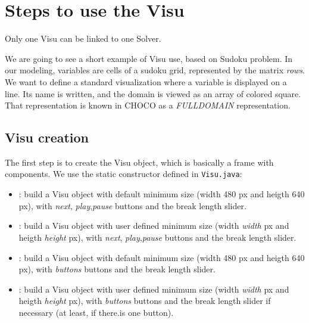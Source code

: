 


\section{Steps to use the Visu}\label{chocoandvisu:stepstousethevisu}\hypertarget{chocoandvisu:stepstousethevisu}{}
Only one Visu can be linked to one Solver.

We are going to see a short example of Visu use, based on Sudoku problem.
In our modeling, variables are cells of a sudoku grid, represented by the matrix \emph{rows}.
We want to define a standard visualization where a variable is displayed on a line. Its name is written, and the domain is viewed as an array of colored square.
That representation is known in CHOCO as a \emph{FULLDOMAIN} representation.
\subsection{Visu creation}\label{chocoandvisu:visucreation}\hypertarget{chocoandvisu:visucreation}{}
The first step is to create the Visu object, which is basically a frame with components. We use the static constructor defined in \texttt{Visu.java}:
\begin{itemize}
	\item {}: build a Visu object with default minimum size (width 480 px and heigth 640 px), with \emph{next}, \emph{play},\emph{pause} buttons and the break length slider.
	\item {}: build a Visu object with user defined minimum size (width \emph{width} px and heigth \emph{height} px), with \emph{next}, \emph{play},\emph{pause} buttons and the break length slider.
	\item {}: build a Visu object with default minimum size (width 480 px and heigth 640 px), with \emph{buttons} buttons and the break length slider.
	\item {}: build a Visu object with user defined minimum size (width \emph{width} px and heigth \emph{height} px), with \emph{buttons} buttons and the break length slider if necessary (at least, if there.is one button).
\end{itemize}

